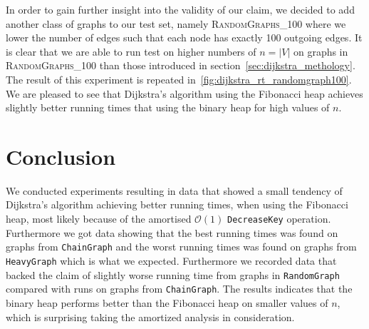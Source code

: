 \documentclass[a4paper,oneside,article,11pt]{memoir}
\begin{document}
In order to gain further insight into the validity of our claim, we decided to add another class of graphs to our test set, namely \textsc{RandomGraphs\_100} where we lower the number of edges such that each node has exactly 100 outgoing edges. It is clear that we are able to run test on higher numbers of $n = \lvert V \lvert$ on graphs in \textsc{RandomGraphs\_100} than those introduced in section~\ref{sec:dijkstra_methology}. The result of this experiment is repeated in~\ref{fig:dijkstra_rt_randomgraph100}. We are pleased to see that Dijkstra's algorithm using the Fibonacci heap achieves slightly better running times that using the binary heap for high values of $n$.

\section{Conclusion}
We conducted experiments resulting in data that showed a small tendency of Dijkstra's algorithm achieving better running times, when using the Fibonacci heap, most likely because of the amortised $\mathcal{O}(1)$ \texttt{DecreaseKey} operation. Furthermore we got data showing that the best running times was found on graphs from \texttt{ChainGraph} and the worst running times was found on graphs from \texttt{HeavyGraph} which is what we expected. Furthermore we recorded data that backed the claim of slightly worse running time from graphs in \texttt{RandomGraph} compared with runs on graphs from \texttt{ChainGraph}. The results indicates that the binary heap performs better than the Fibonacci heap on smaller values of $n$, which is surprising taking the amortized analysis in consideration.


\end{document}
